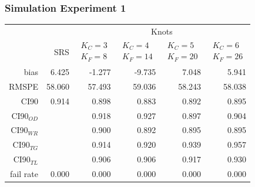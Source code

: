 \documentclass[mathserif,compress]{beamer}\usepackage{graphicx, color}
\begin{document}
\begin{frame}[fragile]
\frametitle{Simulation Experiment 1}

\footnotesize
\begin{table}[ht]
\centering
\begin{tabular}{rrrrrr}
  \hline
  \hline
	&  & \multicolumn{4}{c}{Knots} \\ 
 & SRS & $\begin{array}{c}K_C=3  \\ K_F=8 \end{array}$ & $\begin{array}{c}K_C=4  \\ K_F=14 \end{array}$ & $\begin{array}{c}K_C=5  \\ K_F=20 \end{array}$ & $\begin{array}{c}K_C=6  \\ K_F=26 \end{array}$ \\
  \hline
bias & 6.425 & -1.277 & -9.735 & 7.048 & 5.941 \\ 
  RMSPE & 58.060 & 57.493 & 59.036 & 58.243 & 58.038 \\ 
  CI90 & 0.914 & 0.898 & 0.883 & 0.892 & 0.895 \\ 
  CI90$_{OD}$ &  & 0.918 & 0.927 & 0.897 & 0.904 \\ 
  CI90$_{WR}$ &  & 0.900 & 0.892 & 0.895 & 0.895 \\ 
  CI90$_{TG}$ &  & 0.914 & 0.920 & 0.939 & 0.957 \\ 
  CI90$_{TL}$ &  & 0.906 & 0.906 & 0.917 & 0.930 \\ 
  fail rate & 0.000 & 0.000 & 0.000 & 0.000 & 0.000 \\ 
   \hline
\end{tabular}
\end{table}

\end{frame}

\end{document}
